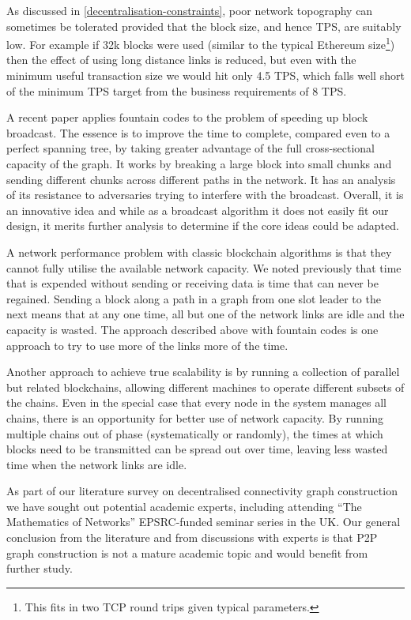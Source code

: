 \documentclass[11pt,a4paper]{article}
\begin{document}
As discussed in
\cref{decentralisation-constraints}, poor
network topography can sometimes be tolerated provided that the block
size, and hence TPS, are suitably low. For example if 32k blocks were
used (similar to the typical Ethereum size\footnote{This fits in two TCP
  round trips given typical parameters.}) then the effect of using long
distance links is reduced, but even with the minimum useful transaction
size we would hit only 4.5 TPS, which falls well short of the minimum
TPS target from the business requirements of 8 TPS.

A recent paper \cite{CBTBC19} applies fountain codes to the problem of
speeding up block broadcast. The essence is to improve the time to
complete, compared even to a perfect spanning tree, by taking greater
advantage of the full cross-sectional capacity of the graph. It works by
breaking a large block into small chunks and sending different chunks
across different paths in the network. It has an analysis of its
resistance to adversaries trying to interfere with the broadcast.
Overall, it is an innovative idea and while as a broadcast algorithm it
does not easily fit our design, it merits further analysis to determine
if the core ideas could be adapted.

A network performance problem with classic blockchain algorithms is that
they cannot fully utilise the available network capacity. We noted
previously that time that is expended without sending or receiving data
is time that can never be regained. Sending a block along a path in a
graph from one slot leader to the next means that at any one time, all
but one of the network links are idle and the capacity is wasted. The
approach described above with fountain codes is one approach to try to
use more of the links more of the time.

Another approach to achieve true scalability is by running a collection
of parallel but related blockchains, allowing different machines to
operate different subsets of the chains. Even in the special case that
every node in the system manages all chains, there is an opportunity for
better use of network capacity. By running multiple chains out of phase
(systematically or randomly), the times at which blocks need to be
transmitted can be spread out over time, leaving less wasted time when
the network links are idle.

As part of our literature survey on decentralised connectivity graph
construction we have sought out potential academic experts, including
attending ``The Mathematics of Networks'' EPSRC-funded seminar series in
the UK. Our general conclusion from the literature and from discussions
with experts is that P2P graph construction is not a mature academic
topic and would benefit from further study.
\end{document}
